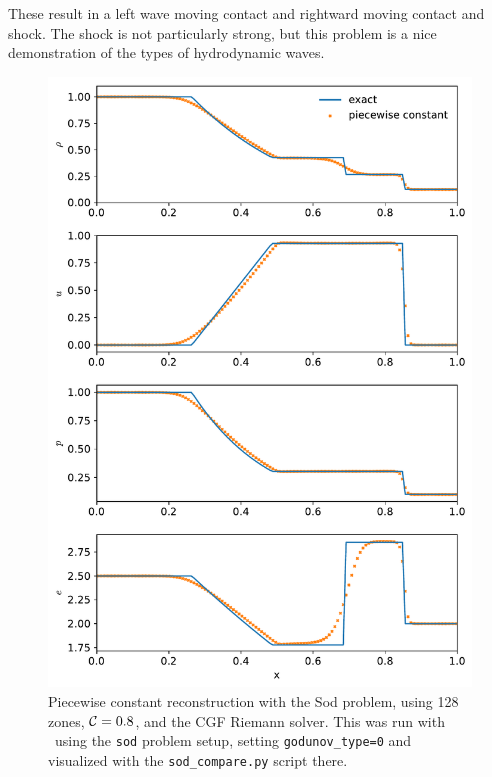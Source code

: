 These result in a left wave moving contact and rightward moving
contact and shock.  The shock is not particularly strong, but this
problem is a nice demonstration of the types of hydrodynamic waves.

\begin{figure}[t]
\centering
\includegraphics[width=0.7\linewidth]{hydro1d_god_sod}
\caption[Piecewise constant reconstruction Sod problem]{\label{fig:Euler:sod:god} Piecewise constant reconstruction
  with the Sod problem, using 128 zones, ${\mathcal{C}} = 0.8$, and the CGF
  Riemann solver.  This was run with \hydrooned\ using the {\tt sod}
  problem setup, setting {\tt godunov\_type=0} and visualized with the
  {\tt sod\_compare.py} script there.}
\end{figure}

